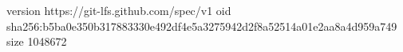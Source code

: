 version https://git-lfs.github.com/spec/v1
oid sha256:b5ba0e350b317883330e492df4e5a3275942d2f8a52514a01e2aa8a4d959a749
size 1048672

